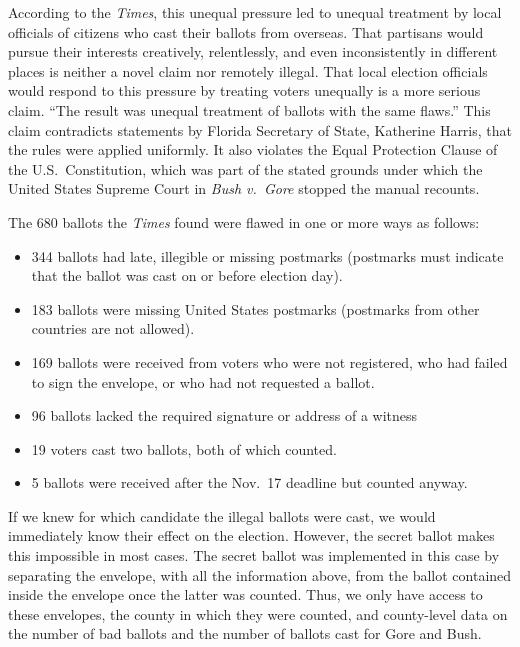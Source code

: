 \documentclass[11pt,titlepage]{article}
\begin{document}
According to the \emph{Times}, this unequal pressure led to unequal
treatment by local officials of citizens who cast their ballots from
overseas.  That partisans would pursue their interests creatively,
relentlessly, and even inconsistently in different places is neither a
novel claim nor remotely illegal.  That local election officials would
respond to this pressure by treating voters unequally is a more
serious claim.  ``The result was unequal treatment of ballots with the
same flaws.'' This claim contradicts statements by Florida Secretary
of State, Katherine Harris, that the rules were applied uniformly.  It
also violates the Equal Protection Clause of the U.S.\ Constitution,
which was part of the stated grounds under which the United States
Supreme Court in \emph{Bush v.\ Gore} stopped the manual recounts.

The 680 ballots the \emph{Times} found were flawed in one or more ways
as follows:
\begin{itemize}
\singlespacing
\item 344 ballots had late, illegible or missing postmarks (postmarks
  must indicate that the ballot was cast on or before election day).
\item 183 ballots were missing United States postmarks (postmarks from
  other countries are not allowed).
\item 169 ballots were received from voters who were not registered,
  who had failed to sign the envelope, or who had not requested a
  ballot.
\item 96 ballots lacked the required signature or address of a witness
\item 19 voters cast two ballots, both of which counted.
\item 5 ballots were received after the Nov.\ 17 deadline but counted
  anyway.
\end{itemize}

If we knew for which candidate the illegal ballots were cast, we would
immediately know their effect on the election. However, the secret
ballot makes this impossible in most cases.  The secret ballot was
implemented in this case by separating the envelope, with all the
information above, from the ballot contained inside the envelope once
the latter was counted.  Thus, we only have access to these envelopes,
the county in which they were counted, and county-level data on the
number of bad ballots and the number of ballots cast for Gore and
Bush.
\end{document}
